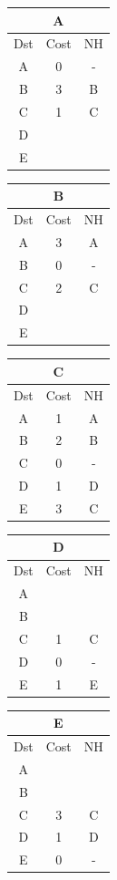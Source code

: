 \documentclass[10pt]{article}
\begin{document}
			\begin{table}[h!]
				\begin{tabular}{|c||c||c|}
					\hline
					\multicolumn{3}{|c|}{A} \\
					\hline
					Dst & Cost & NH \\
					\hline
					A & 0 & - \\
					B & 3 & B \\
					C & 1 & C \\
					D &   &   \\
					E &   &   \\
					\hline
				\end{tabular}
				\begin{tabular}{|c||c||c|}
					\hline
					\multicolumn{3}{|c|}{B} \\
					\hline
					Dst & Cost & NH \\
					\hline
					A & 3 & A \\
					B & 0 & - \\
					C & 2 & C \\
					D &   &   \\
					E &   &   \\
					\hline
				\end{tabular}
				\begin{tabular}{|c||c||c|}
					\hline
					\multicolumn{3}{|c|}{C} \\
					\hline
					Dst & Cost & NH \\
					\hline
					A & 1 & A \\
					B & 2 & B \\
					C & 0 & - \\
					D & 1 & D \\
					E & 3 & C \\
					\hline
				\end{tabular}
				\begin{tabular}{|c||c||c|}
					\hline
					\multicolumn{3}{|c|}{D} \\
					\hline
					Dst & Cost & NH \\
					\hline
					A &   &   \\
					B &   &   \\
					C & 1 & C \\
					D & 0 & - \\
					E & 1 & E \\
					\hline
				\end{tabular}
				\begin{tabular}{|c||c||c|}
					\hline
					\multicolumn{3}{|c|}{E} \\
					\hline
					Dst & Cost & NH \\
					\hline
					A &   &   \\
					B &   &   \\
					C & 3 & C \\
					D & 1 & D \\
					E & 0 & - \\
					\hline
				\end{tabular}
			\end{table}
\end{document}

